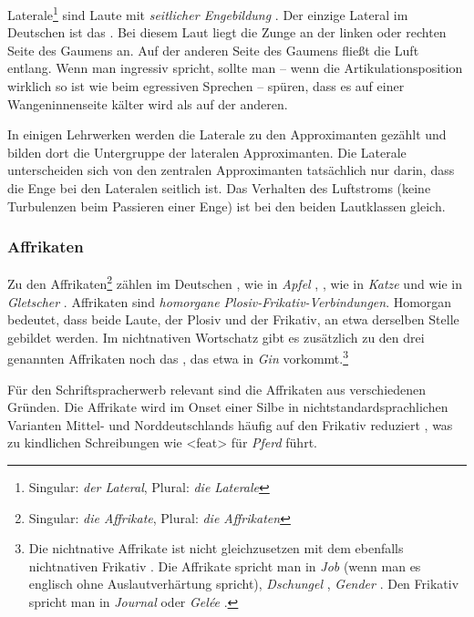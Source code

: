 Laterale\footnote{Singular: \textit{der Lateral}, Plural: \textit{die Laterale}} sind Laute mit \textit{seitlicher Engebildung} \citep[183]{Pompino-Marschall2020}. Der einzige Lateral im Deutschen ist das \textipa{[l]}. Bei diesem Laut liegt die Zunge an der linken oder rechten Seite des Gaumens an. Auf der anderen Seite des Gaumens fließt die Luft entlang. Wenn man \textipa{[l]} ingressiv spricht, sollte man -- wenn die Artikulationsposition wirklich so ist wie beim egressiven Sprechen -- spüren, dass es auf einer Wangeninnenseite kälter wird als auf der anderen.

In einigen Lehrwerken werden die Laterale zu den Approximanten gezählt und bilden dort die Untergruppe der lateralen Approximanten. Die Laterale unterscheiden sich von den zentralen Approximanten tatsächlich nur darin, dass die Enge bei den Lateralen seitlich ist. Das Verhalten des Luftstroms (keine Turbulenzen beim Passieren einer Enge) ist bei den beiden Lautklassen gleich.


\subsubsection{Affrikaten}\label{sec:Affrikaten}
Zu den Affrikaten\footnote{Singular: \textit{die Affrikate}, Plural: \textit{die Affrikaten}} zählen im Deutschen \textipa{[\t{pf}]}, wie in \textit{Apfel} \textipa{[\textprimstress Pa\.*{\t{pf}}@l]}, \textipa{[\t{ts}]}, wie in \textit{Katze} \textipa{[\textprimstress ka\.*{\t{ts}}@]} und \textipa{[\t{tS}]} wie in \textit{Gletscher} . Affrikaten sind \textit{homorgane Plosiv-Frikativ-Verbindungen}. Homorgan bedeutet, dass beide Laute, der Plosiv und der Frikativ, an etwa derselben Stelle gebildet werden.  Im nichtnativen Wortschatz gibt es zusätzlich zu den drei genannten Affrikaten noch das \textipa{[\t{dZ}]}, das etwa in \textit{Gin} \textipa{[\t{dZ}In]} vorkommt.\footnote{Die nichtnative Affrikate\textipa{[\t{dZ}]} ist nicht gleichzusetzen mit dem ebenfalls nichtnativen Frikativ \textipa{[Z]}. Die Affrikate spricht man in \textit{Job} \textipa{[\t{dZ}Ob]} (wenn man es englisch ohne Auslautverhärtung spricht), \textit{Dschungel} \textipa{[\textprimstress \t{dZ}U\.*N@l]}, \textit{Gender} \textipa{[\t{dZ}En.d5]}. Den Frikativ spricht man in \textit{Journal}  oder \textit{Gelée} \textipa{[Ze\textprimstress le:]}.}


Für den Schriftspracherwerb relevant sind die Affrikaten aus verschiedenen Gründen. Die Affrikate \textipa{[\t{pf}]} wird im Onset einer Silbe in nichtstandardsprachlichen Varianten Mittel- und Norddeutschlands häufig auf den Frikativ \textipa{[f]} reduziert \citep[693]{DudenAussprache2023}, was zu kindlichen Schreibungen wie <feat> für \textit{Pferd} führt.

